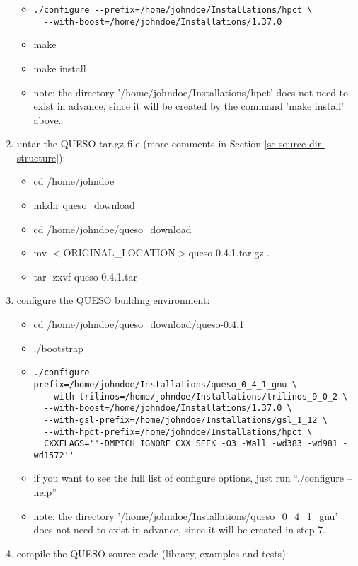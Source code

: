 \begin{enumerate}
{\begin{itemize}
{\begin{itemize}
\item {
\begin{verbatim}
./configure --prefix=/home/johndoe/Installations/hpct \
  --with-boost=/home/johndoe/Installations/1.37.0
\end{verbatim}
}
\item make
\item make install
\item note: the directory '/home/johndoe/Installations/hpct' does not need to exist in advance, since it will be created by the command 'make install' above.
\end{itemize}
}
\end{itemize}
}
\item {untar the QUESO tar.gz file (more comments in Section \ref{sc-source-dir-structure}): %
\begin{itemize}
\item cd /home/johndoe
\item mkdir queso\_download
\item cd /home/johndoe/queso\_download
\item mv $<$ORIGINAL\_LOCATION$>$queso-0.4.1.tar.gz .
\item tar -zxvf queso-0.4.1.tar
\end{itemize}
}
\item {configure the QUESO building environment: %
\begin{itemize}
\item cd /home/johndoe/queso\_download/queso-0.4.1
\item ./bootstrap
\item {
\begin{verbatim}
./configure --prefix=/home/johndoe/Installations/queso_0_4_1_gnu \
  --with-trilinos=/home/johndoe/Installations/trilinos_9_0_2 \
  --with-boost=/home/johndoe/Installations/1.37.0 \
  --with-gsl-prefix=/home/johndoe/Installations/gsl_1_12 \
  --with-hpct-prefix=/home/johndoe/Installations/hpct \
  CXXFLAGS=''-DMPICH_IGNORE_CXX_SEEK -O3 -Wall -wd383 -wd981 -wd1572''
\end{verbatim}
}
\item if you want to see the full list of configure options, just run ``./configure --help''
\item note: the directory '/home/johndoe/Installations/queso\_0\_4\_1\_gnu' does not need to exist in advance, since it will be created in step 7.
\end{itemize}
}
\item {compile the QUESO source code (library, examples and tests): %
}
\end{enumerate}
